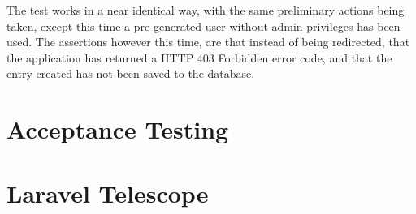 The test works in a near identical way, with the same preliminary actions being taken, except this time a pre-generated user without admin privileges has been used. The assertions however this time, are that instead of being redirected, that the application has returned a HTTP 403 Forbidden error code, and that the entry created has not been saved to the database.

\section{Acceptance Testing}

\section{Laravel Telescope}